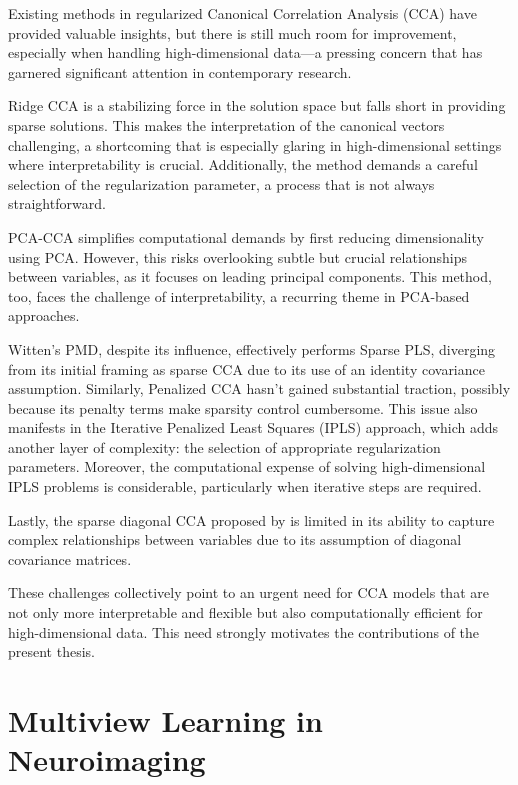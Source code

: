 Existing methods in regularized Canonical Correlation Analysis (CCA) have provided valuable insights, but there is still much room for improvement, especially when handling high-dimensional data—a pressing concern that has garnered significant attention in contemporary research.

Ridge CCA is a stabilizing force in the solution space but falls short in providing sparse solutions.
This makes the interpretation of the canonical vectors challenging, a shortcoming that is especially glaring in high-dimensional settings where interpretability is crucial.
Additionally, the method demands a careful selection of the regularization parameter, a process that is not always straightforward.

PCA-CCA simplifies computational demands by first reducing dimensionality using PCA. However, this risks overlooking subtle but crucial relationships between variables, as it focuses on leading principal components.
This method, too, faces the challenge of interpretability, a recurring theme in PCA-based approaches.

Witten's PMD, despite its influence, effectively performs Sparse PLS, diverging from its initial framing as sparse CCA due to its use of an identity covariance assumption.
Similarly, Penalized CCA \cite{parkhomenko2009sparse} hasn't gained substantial traction, possibly because its penalty terms make sparsity control cumbersome.
This issue also manifests in the Iterative Penalized Least Squares (IPLS) approach, which adds another layer of complexity: the selection of appropriate regularization parameters.
Moreover, the computational expense of solving high-dimensional IPLS problems is considerable, particularly when iterative steps are required.

Lastly, the sparse diagonal CCA proposed by \cite{asteris2016simple} is limited in its ability to capture complex relationships between variables due to its assumption of diagonal covariance matrices.

These challenges collectively point to an urgent need for CCA models that are not only more interpretable and flexible but also computationally efficient for high-dimensional data.
This need strongly motivates the contributions of the present thesis.


\section{Multiview Learning in Neuroimaging}

